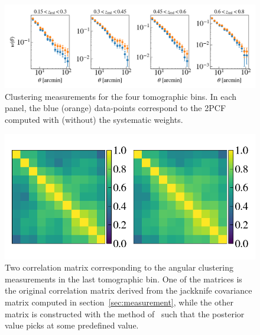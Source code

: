 \documentclass[fleqn,usenatbib,useAMS]{mnras}
\begin{document}
\begin{figure}
\includegraphics[width=\textwidth]{figures_tmp/xi.png}
\caption{\label{fig:xi} Clustering measurements for the four tomographic bins. In each panel, the blue (orange) data-points correspond to the 2PCF computed with (without) the systematic weights.} 
\end{figure}


\begin{figure}
\includegraphics[width=\textwidth]{figures_tmp/correlation_0_6.png}
\caption{\label{fig:covariance_estimate} Two correlation matrix corresponding to the angular clustering measurements in the last tomographic bin. One of the matrices is the original correlation matrix derived from the jackknife covariance matrix computed in section~\ref{sec:measurement}, while the other matrix is constructed with the method of~\citet{sellentin2019} such that the posterior value picks at some predefined value.} 
\end{figure}
\end{document}
